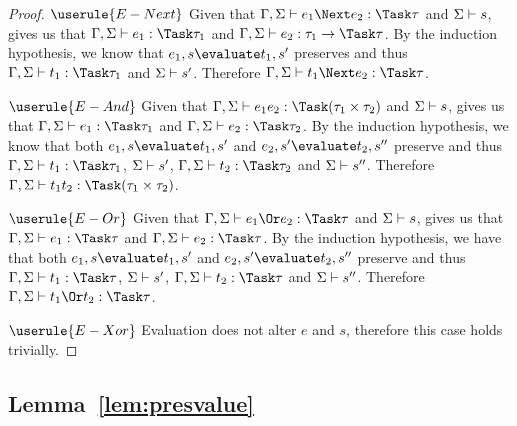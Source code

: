\begin{proof}
  \case
    {$\userule{E-Next}$}
    {Given that $\Gamma,\Sigma\infers e_1\Next e_2:\Task \tau$ and $\Sigma\vdash s$,  gives us that $\Gamma,\Sigma\infers e_1:\Task\tau_1$ and $\Gamma,\Sigma\infers e_2:\tau_1 \to \Task \tau$.
    By the induction hypothesis, we know that $e_1,s\evaluate t_1,s'$ preserves and thus $\Gamma,\Sigma\infers t_1:\Task\tau_1$ and $\Sigma\vdash s'$.
    Therefore $\Gamma,\Sigma\infers t_1\Next e_2:\Task\tau$.}

  \case
    {$\userule{E-And}$}
    {Given that $\Gamma,\Sigma\infers e_1\And e_2:\Task(\tau_1\times\tau_2)$ and $\Sigma\vdash s$,  gives us that $\Gamma,\Sigma\infers e_1:\Task\tau_1$ and $\Gamma,\Sigma\infers e_2:\Task\tau_2$.
    By the induction hypothesis, we know that both $e_1,s\evaluate t_1,s'$ and $e_2,s'\evaluate t_2,s''$ preserve and thus $\Gamma,\Sigma\infers t_1:\Task\tau_1$, $\Sigma\vdash s'$, $\Gamma,\Sigma\infers t_2:\Task\tau_2$ and $\Sigma\vdash s''$.
    Therefore $\Gamma,\Sigma\infers t_1\And t_2:\Task(\tau_1\times\tau_2)$.}

  \case
    {$\userule{E-Or}$}
    {Given that $\Gamma,\Sigma\infers e_1\Or e_2:\Task\tau$ and $\Sigma\vdash s$,  gives us that $\Gamma,\Sigma\infers e_1:\Task\tau$ and $\Gamma,\Sigma\infers e_2:\Task\tau$.
    By the induction hypothesis, we have that both $e_1,s\evaluate t_1,s'$ and $e_2,s'\evaluate t_2,s''$ preserve and thus $\Gamma,\Sigma\infers t_1:\Task\tau$, $\Sigma\vdash s'$, $\Gamma,\Sigma\infers t_2:\Task\tau$ and $\Sigma\vdash s''$.
    Therefore $\Gamma,\Sigma\infers t_1\Or t_2:\Task\tau$.}

  \case
    {$\userule{E-Xor}$}
    {Evaluation does not alter $e$ and $s$, therefore this case holds trivially.}

\end{proof}



\subsection{Lemma~\ref{lem:presvalue}}

